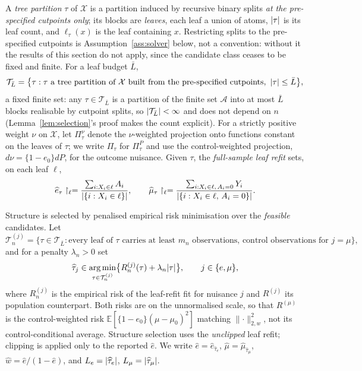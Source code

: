 \documentclass[11pt]{article}
\theoremstyle{plain}
\theoremstyle{definition}
\theoremstyle{remark}
\newcommand{\E}{\mathbb{E}}
\newcommand{\cX}{\mathcal{X}}
\newcommand{\cA}{\mathcal{A}}
\newcommand{\cT}{\mathcal{T}}
\newcommand{\ez}{e_0}
\newcommand{\mz}{\mu_0}
\newcommand{\ehat}{\widehat{e}}
\newcommand{\mhat}{\widehat{\mu}}
\newcommand{\what}{\widehat{w}}
\newcommand{\that}{\widehat{\tau}}
\newcommand{\Lw}[1]{\lVert #1 \rVert_{2,w}}
\DeclareMathOperator*{\argmin}{arg\,min}
\DeclarePairedDelimiter{\card}{\lvert}{\rvert}
\begin{document}
A \emph{tree partition} $\tau$ of $\cX$ is a partition induced by recursive
binary splits \emph{at the pre-specified cutpoints only}; its blocks are
\emph{leaves}, each leaf a union of atoms, $\card\tau$ is its leaf count, and
$\ell_\tau(x)$ is the leaf containing $x$. Restricting splits to the
pre-specified cutpoints is Assumption~\ref{ass:solver} below, not a
convention: without it the results of this section do not apply, since the
candidate class ceases to be fixed and finite. For a leaf budget $\bar L$,
\[
  \cT_{\bar L}=\bigl\{\tau:\tau\text{ a tree partition of }\cX\text{ built
  from the pre-specified cutpoints},\ \card\tau\le\bar L\bigr\},
\]
a fixed finite set: any $\tau\in\cT_{\bar L}$ is a partition of the finite
set $\cA$ into at most $\bar L$ blocks realisable by cutpoint splits, so
$\card{\cT_{\bar L}}<\infty$ and does not depend on $n$
(Lemma~\ref{lem:selection}'s proof makes the count explicit). For a strictly
positive weight $\nu$ on $\cX$, let $\Pi^\nu_\tau$ denote the $\nu$-weighted
projection onto functions constant on the leaves of $\tau$; we write
$\Pi_\tau$ for $\Pi^{P}_\tau$ and use the control-weighted projection,
$d\nu=\{1-\ez\}dP$, for the outcome nuisance. Given $\tau$, the
\emph{full-sample leaf refit} sets, on each leaf $\ell$,
\begin{equation}\label{eq:refit}
  \ehat_\tau\restriction_\ell
  =\frac{\sum_{i:X_i\in\ell}A_i}{\card{\{i:X_i\in\ell\}}},
  \qquad
  \mhat_\tau\restriction_\ell
  =\frac{\sum_{i:X_i\in\ell,\,A_i=0}Y_i}
        {\card{\{i:X_i\in\ell,\,A_i=0\}}} .
\end{equation}

Structure is selected by penalised empirical risk minimisation over the
\emph{feasible} candidates. Let
\begin{equation}\label{eq:feasible}
  \cT^{(j)}_n=\bigl\{\tau\in\cT_{\bar L}:\text{every leaf of }\tau\text{ carries
   at least }m_n\text{ observations, control observations for }j=\mu\bigr\},
\end{equation}
and for a penalty $\lambda_n>0$ set
\begin{equation}\label{eq:select}
  \that_j\in\argmin_{\tau\in\cT^{(j)}_n}
  \bigl\{R^{(j)}_n(\tau)+\lambda_n\card\tau\bigr\},
  \qquad j\in\{e,\mu\},
\end{equation}
where $R^{(j)}_n$ is the empirical risk of the leaf-refit fit for nuisance $j$
and $R^{(j)}$ its population counterpart. Both risks are on the unnormalised
scale, so that $R^{(\mu)}$ is the control-weighted risk
$\E[\{1-\ez\}(\mu-\mz)^2]$ matching $\Lw\cdot^2$, not its control-conditional
average. Structure selection uses the \emph{unclipped} leaf refit; clipping is
applied only to the reported $\ehat$. We write $\ehat=\ehat_{\that_e}$,
$\mhat=\mhat_{\that_\mu}$, $\what=\ehat/(1-\ehat)$, and
$L_e=\card{\that_e}$, $L_\mu=\card{\that_\mu}$.
\end{document}
